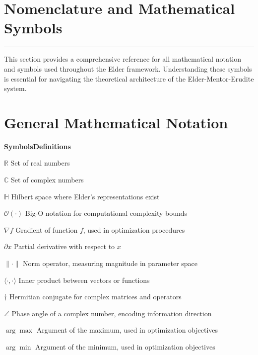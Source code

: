 \chapter*{Nomenclature and Mathematical Symbols}

\begin{center}
\rule{0.5\textwidth}{0.5pt}
\end{center}

\vspace{0.5cm}
\noindent This section provides a comprehensive reference for all mathematical notation and symbols used throughout the Elder framework. Understanding these symbols is essential for navigating the theoretical architecture of the Elder-Mentor-Erudite system.

\clearpage
\chapter*{General Mathematical Notation}

\begin{multicols}{2}
\noindent\textbf{\large Symbols}\hfill\textbf{\large Definitions}

\vspace{0.3cm}
\noindent$\mathbb{R}$ \dotfill Set of real numbers

\noindent$\mathbb{C}$ \dotfill Set of complex numbers

\noindent$\mathbb{H}$ \dotfill Hilbert space where Elder's representations exist

\noindent$\mathcal{O}(\cdot)$ \dotfill Big-O notation for computational complexity bounds

\noindent$\nabla f$ \dotfill Gradient of function $f$, used in optimization procedures

\noindent$\partial x$ \dotfill Partial derivative with respect to $x$

\noindent$\| \cdot \|$ \dotfill Norm operator, measuring magnitude in parameter space

\noindent$\langle \cdot, \cdot \rangle$ \dotfill Inner product between vectors or functions

\noindent$\dagger$ \dotfill Hermitian conjugate for complex matrices and operators

\noindent$\angle$ \dotfill Phase angle of a complex number, encoding information direction

\noindent$\arg\max$ \dotfill Argument of the maximum, used in optimization objectives

\noindent$\arg\min$ \dotfill Argument of the minimum, used in optimization objectives
\end{multicols}

